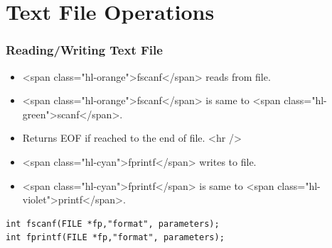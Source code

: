 \documentclass{../c-lecture}
\begin{document}
\section{Text File Operations}

\begin{frame}[fragile]
  \frametitle{Reading/Writing Text File}
  \begin{itemize}
    \item <span class="hl-orange">fscanf</span> reads from file.
    \item
      <span class="hl-orange">fscanf</span> is same to
      <span class="hl-green">scanf</span>.

    \item Returns EOF if reached to the end of file.
    <hr />
    \item <span class="hl-cyan">fprintf</span> writes to file.
    \item
      <span class="hl-cyan">fprintf</span> is same to
      <span class="hl-violet">printf</span>.

  \end{itemize}
  \begin{verbatim}
int fscanf(FILE *fp,"format", parameters);
int fprintf(FILE *fp,"format", parameters);
  \end{verbatim}
\end{frame}
\end{document}
